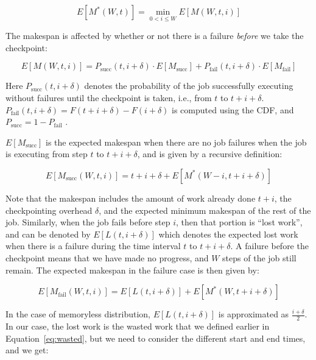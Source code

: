 \begin{equation}
  \label{eq:m0}
  E[M^*(W, t)] = \min_{0<i\leq W}{E[M(W, t, i)]}
\end{equation}

The makespan is affected by whether or not there is a failure \emph{before} we take the checkpoint: 

\begin{equation}
  \label{eq:m1}
E[M(W, t, i)] = P_{\text{succ}}(t, i+\delta) \cdot E[M_{\text{succ}}] + P_{\text{fail}}(t, i+\delta) \cdot E[M_{\text{fail}}]
\end{equation}

Here $P_{\text{succ}}(t, i+\delta)$ denotes the probability of the job successfully executing without failures until the checkpoint is taken, i.e., from $t$ to $t+i+\delta$. $P_{\text{fail}}(t, i+\delta) = F(t+i+\delta)-F(i+\delta)$ is computed using the CDF, 
and $P_{\text{succ}} = 1 - P_{\text{fail}}$ .



$E[M_{\text{succ}}]$ is the expected makespan when there are no job failures when the job is executing from step $t$ to $t+i+\delta$, and is given by a recursive definition:

\begin{equation}
  \label{eq:msuc}
E[M_{\text{succ}}(W, t, i)] = t+i+\delta + E[M^*(W-i, t+i+\delta)]  
\end{equation}

\noindent Note that the makespan includes the amount of work already done $t+i$, the checkpointing overhead $\delta$, and the expected minimum makespan of the rest of the job.
Similarly, when the job fails before step $i$, then that portion is ``lost work'', and can be denoted by $E[L(t, i+\delta)]$ which denotes the expected lost work when there is a failure during the time interval $t$ to $t+i+\delta$.
A failure before the checkpoint means that we have made no progress, and $W$ steps of the job still remain.
The expected makespan in the failure case is then given by:

\begin{equation}
  \label{eq:mfail}
 E[M_{\text{fail}}(W, t, i)] = E[L(t, i+\delta)] + E[M^*(W, t+i+\delta)]
\end{equation}



In the case of memoryless distribution, $E[L(t, i+\delta)]$ is approximated as $\frac{i+\delta}{2}$.
In our case, the lost work is the wasted work that we defined earlier in Equation~\ref{eq:wasted}, but we need to consider the different start and end times, and we get:

